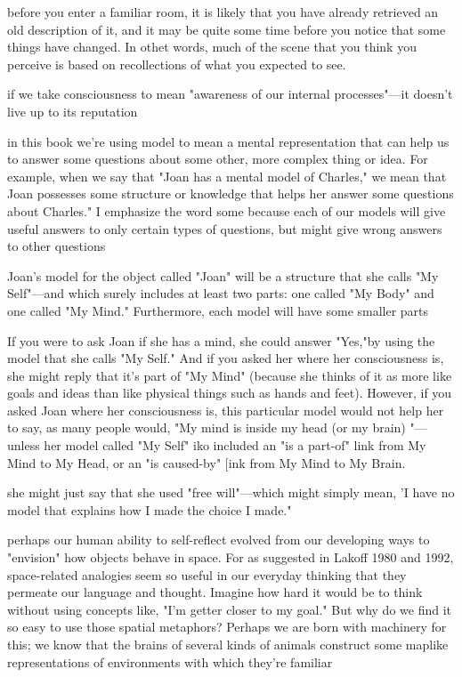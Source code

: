 \documentclass[10pt,a4paper]{article}
\begin{document}
before you enter a familiar room, it is likely that you have already retrieved an old description of it, and it may be quite some time before you notice that some things have changed. In othet words, much of the scene that you think you perceive is based on recollections of what you expected to see. \cite[p.~118]{minsky}

if we take consciousness to mean "awareness of our internal processes"—it doesn't live up to its reputation \cite[p.~120]{minsky}

in this book we're using model to mean a mental representation that can help us to answer some questions about some other, more complex thing or idea. For example, when we say that "Joan has a mental model of Charles," we mean that Joan possesses some structure or knowledge that helps her answer some questions about Charles." I emphasize the word some because each of our models will give useful answers to only certain types of questions, but might give wrong answers to other questions \cite[p.~121]{minsky}

Joan's model for the object called "Joan" will be a structure that she calls "My Self"—and which surely includes at least two parts: one called "My Body" and one called "My Mind." Furthermore, each model will have some smaller parts \cite[p.~122]{minsky}

If you were to ask Joan if she has a mind, she could answer "Yes,"by using the model that she calls "My Self." And if you asked her where her consciousness is, she might reply that it's part of "My Mind" (because she thinks of it as more like goals and ideas than like physical things such as hands and feet). However, if you asked Joan where her consciousness is, this particular model would not help her to say, as many people would, "My mind is inside my head (or my brain) "—unless her model called "My Self" iko included an "is a part-of" link from My Mind to My Head, or an "is caused-by" [ink from My Mind to My Brain. \cite[p.~122]{minsky}

she might just say that she used "free will"—which might simply mean, 'I have no model that explains how I made the choice I made." \cite[p.~123]{minsky}

perhaps our human ability to self-reflect evolved from our developing ways to "envision" how objects behave in space. For as suggested in Lakoff 1980 and 1992, space-related analogies seem so useful in our everyday thinking that they permeate our language and thought. Imagine how hard it would be to think without using concepts like, "I'm getter closer to my goal." But why do we find it so easy to use those spatial metaphors? Perhaps we are born with machinery for this; we know that the brains of several kinds of animals construct some maplike representations of environments with which they're familiar \cite[p.~125]{minsky}
\end{document}

